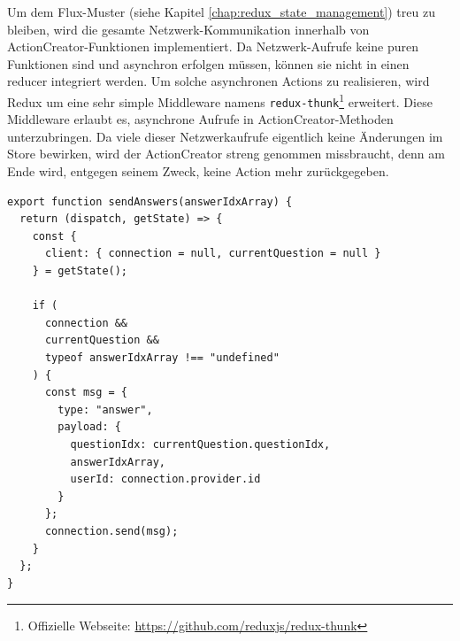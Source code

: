 Um dem Flux-Muster (siehe Kapitel \ref{chap:redux_state_management}) treu zu bleiben, wird die gesamte Netzwerk-Kommunikation innerhalb von ActionCreator-Funktionen implementiert. Da Netzwerk-Aufrufe keine puren Funktionen sind und asynchron erfolgen müssen, können sie nicht in einen reducer integriert werden. Um solche asynchronen Actions zu realisieren, wird Redux um eine sehr simple Middleware namens \texttt{redux-thunk}\footnote{Offizielle Webseite: \url{https://github.com/reduxjs/redux-thunk}} erweitert. Diese Middleware erlaubt es, asynchrone Aufrufe in ActionCreator-Methoden unterzubringen. Da viele dieser Netzwerkaufrufe eigentlich keine Änderungen im Store bewirken, wird der ActionCreator streng genommen missbraucht, denn am Ende wird, entgegen seinem Zweck, keine Action mehr zurückgegeben.

\begin{minipage}{\linewidth}
\begin{lstlisting}[caption={ActionCreator zum Versenden von Antworten vom Client zum Server. (aus: src/client/actions/client.js)}]
export function sendAnswers(answerIdxArray) {
  return (dispatch, getState) => {
    const {
      client: { connection = null, currentQuestion = null }
    } = getState();

    if (
      connection &&
      currentQuestion &&
      typeof answerIdxArray !== "undefined"
    ) {
      const msg = {
        type: "answer",
        payload: {
          questionIdx: currentQuestion.questionIdx,
          answerIdxArray,
          userId: connection.provider.id
        }
      };
      connection.send(msg);
    }
  };
}
\end{lstlisting}
\end{minipage}